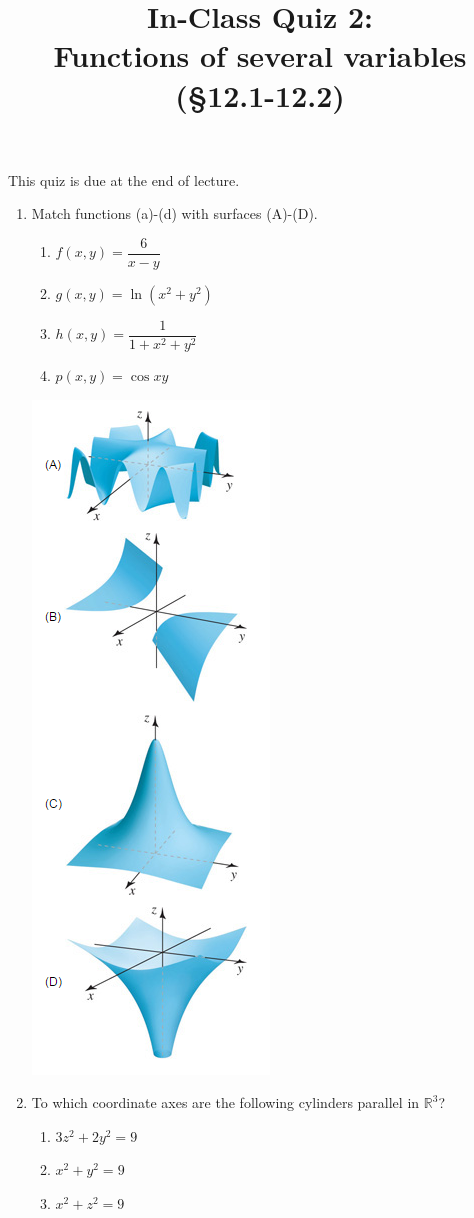 \documentclass[]{article}
\title{\vspace{-3.5pc} 
	\flushleft \bf \Large In-Class Quiz 2: \\ Functions of several variables (\S 12.1-12.2)}
\date{}
\begin{document}
\maketitle

\vspace{-3pc}
 This quiz is due at the end of lecture.  

\noindent\hrulefill

\begin{enumerate}

\item %
Match functions (a)-(d) with surfaces (A)-(D).
\begin{enumerate}
	\item $f(x,y)=\dfrac{6}{x-y}$
	\item $g(x,y)=\ln{(x^2+y^2)}$
	\item $h(x,y)=\dfrac{1}{1+x^2+y^2}$
	\item $p(x,y)=\cos{xy}$
\end{enumerate}
\includegraphics[scale=0.75]{Q2surfaces}

\item %
To which coordinate axes are the following cylinders parallel in $\mathbb R^3$?
\begin{enumerate}
	\item $3z^2+2y^2=9$
	\item $x^2+y^2=9$
	\item $x^2+z^2=9$
\end{enumerate}	

\end{enumerate}
\end{document}
